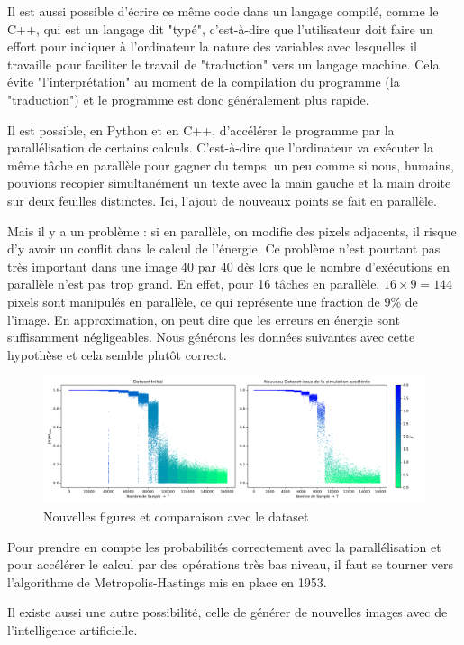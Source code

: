 \documentclass[11pt, parskip=half]{scrartcl} %
\begin{document}
Il est aussi possible d'écrire ce même code dans un langage compilé, comme le C++, qui est un langage dit "typé", c'est-à-dire que l'utilisateur doit faire un effort pour indiquer à l'ordinateur la nature des variables avec lesquelles il travaille pour faciliter le travail de "traduction" vers un langage machine. Cela évite "l'interprétation" au moment de la compilation du programme (la "traduction") et le programme est donc généralement plus rapide.

Il est possible, en Python et en C++, d'accélérer le programme par la parallélisation de certains calculs. C'est-à-dire que l'ordinateur va exécuter la même tâche en parallèle pour gagner du temps, un peu comme si nous, humains, pouvions recopier simultanément un texte avec la main gauche et la main droite sur deux feuilles distinctes. Ici, l'ajout de nouveaux points se fait en parallèle.

Mais il y a un problème : si en parallèle, on modifie des pixels adjacents, il risque d'y avoir un conflit dans le calcul de l'énergie. Ce problème n'est pourtant pas très important dans une image 40 par 40 dès lors que le nombre d'exécutions en parallèle n'est pas trop grand. En effet, pour 16 tâches en parallèle, $16 \times 9 = 144$ pixels sont manipulés en parallèle, ce qui représente une fraction de 9\% de l'image. En approximation, on peut dire que les erreurs en énergie sont suffisamment négligeables. Nous générons les données suivantes avec cette hypothèse et cela semble plutôt correct.

\begin{figure}[h]
	\centering
	\includegraphics[width=0.95\linewidth]{./figures/new_data_compare.png}
	\caption{Nouvelles figures et comparaison avec le dataset}
	\label{fig:H}
\end{figure}

Pour prendre en compte les probabilités correctement avec la parallélisation et pour accélérer le calcul par des opérations très bas niveau, il faut se tourner vers l'algorithme de Metropolis-Hastings mis en place en 1953.

Il existe aussi une autre possibilité, celle de générer de nouvelles images avec de l'intelligence artificielle.
\end{document}
